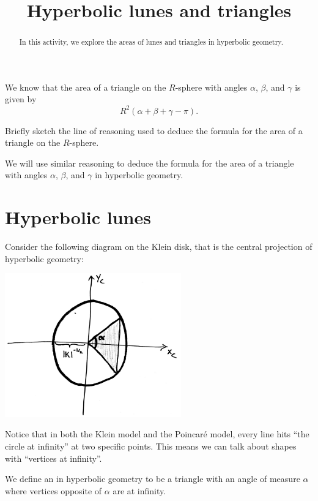 \documentclass[newpage,hints,handout]{ximera}
\title{Hyperbolic lunes and triangles}
\begin{document}
\begin{abstract}
In this activity, we explore the areas of lunes and triangles in
hyperbolic geometry.
\end{abstract}
\maketitle

We know that the area of a triangle on the $R$-sphere with angles
$\alpha$, $\beta$, and $\gamma$ is given by
\[
R^2(\alpha+\beta+\gamma - \pi).
\]
\begin{problem}
  Briefly sketch the line of reasoning used to deduce the formula for
  the area of a triangle on the $R$-sphere.
\end{problem}

We will use similar reasoning to deduce the formula for the area of a triangle
with angles $\alpha$, $\beta$, and $\gamma$ in hyperbolic geometry.

\section{Hyperbolic lunes}

Consider the following diagram on the Klein disk, that is the central projection
of hyperbolic geometry:
\begin{image}
  \includegraphics[width=3in]{diagramOfHyperbolicLune.png}
\end{image}

Notice that in both the Klein model and the Poincar\'e model, every line hits
``the circle at infinity'' at two specific points.  This means we can talk about
shapes with ``vertices at infinity''.

\begin{definition}
  We define an  in hyperbolic geometry to be a
  triangle with an angle of measure $\alpha$ where vertices opposite of $\alpha$
  are at infinity.
\end{definition}
\end{document}
